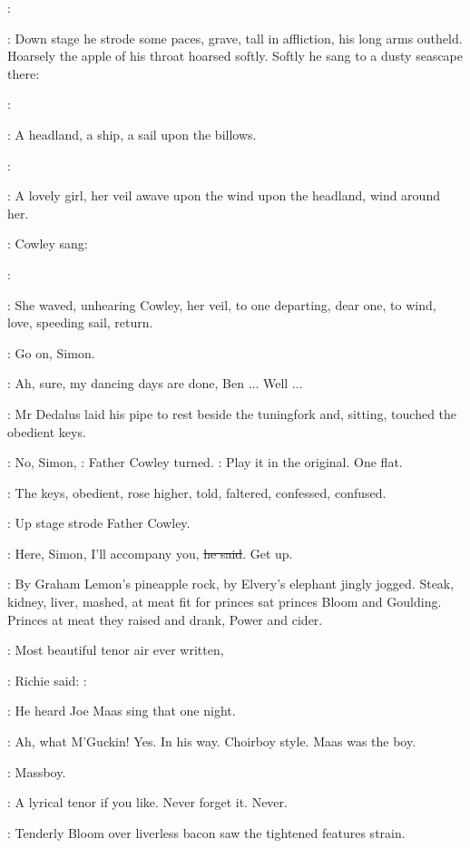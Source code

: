 \cowley:

:
Down stage he strode some paces, grave, tall in affliction, his long
arms outheld. Hoarsely the apple of his throat hoarsed softly. Softly he
sang to a dusty seascape there:

\simon:

:
A headland, a ship, a
sail upon the billows.

\simon:

:
A lovely girl, her veil awave upon the
wind upon the headland, wind around her.

:
Cowley sang:

\cowley:

:
She waved, unhearing Cowley, her veil, to one departing, dear one, to
wind, love, speeding sail, return.

\dollard:
Go on, Simon.

\simon:
Ah, sure, my dancing days are done, Ben ... Well ...

:
Mr Dedalus laid his pipe to rest beside the tuningfork
and, sitting,
touched the obedient keys.

\cowley:
No, Simon,
:
Father Cowley turned.
\cowley:
Play it in the original. One flat.

:
The keys, obedient, rose higher, told, faltered,
confessed, confused.

:
Up stage strode Father Cowley.

\cowley:
Here, Simon, I'll accompany you,
\sout{he said}.
Get up.

:
By Graham Lemon's pineapple rock, by Elvery's elephant jingly
jogged. Steak, kidney, liver, mashed, at meat fit for princes sat princes
Bloom and Goulding. Princes at meat they raised and drank, Power and
cider.

\goulding:
Most beautiful tenor air ever written,

:
Richie said:
\goulding:

:
He heard Joe Maas sing that one night.

\goulding:
Ah, what M'Guckin!
Yes.
In his way.
Choirboy style.
Maas was the boy.

\BloomInt:
Massboy.

\goulding:
A lyrical tenor if you like.
Never forget it.
Never.

:
Tenderly Bloom over liverless bacon saw
the tightened features strain.

